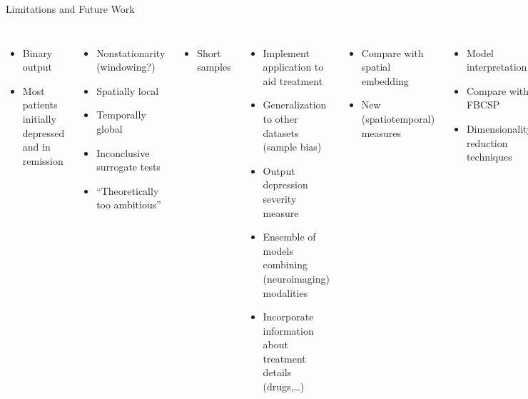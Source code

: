 \documentclass{beamer}
\begin{document}

\begin{frame}[t]{Limitations and Future Work}
  \centering
  \begin{columns}[t]
    \begin{itemize}
      \item Binary output
      \item Most patients initially depressed and in remission %
    \end{itemize}
        \begin{itemize}
          \item Nonstationarity {\scriptsize (windowing?)} 
          \item Spatially local %
          \item Temporally global
          \item Inconclusive surrogate tests
          \item ``Theoretically too ambitious''
        \end{itemize}
        \begin{itemize}
          \item Short samples
        \end{itemize}

    \scriptsize
    \begin{itemize}
      \item Implement application to aid treatment
      \item Generalization to other datasets {\scriptsize (sample bias) }
      \item Output depression severity measure
      \item Ensemble of models combining (neuroimaging) modalities
      \item Incorporate information about treatment details (drugs,\ldots)
    \end{itemize}
        \begin{itemize}
          \item Compare with spatial embedding
          \item New (spatiotemporal) measures
        \end{itemize}
        \begin{itemize}
          \item Model interpretation %
          \item Compare with FBCSP
          \item Dimensionality reduction techniques
        \end{itemize}
  \end{columns}
\end{frame}
\end{document}
